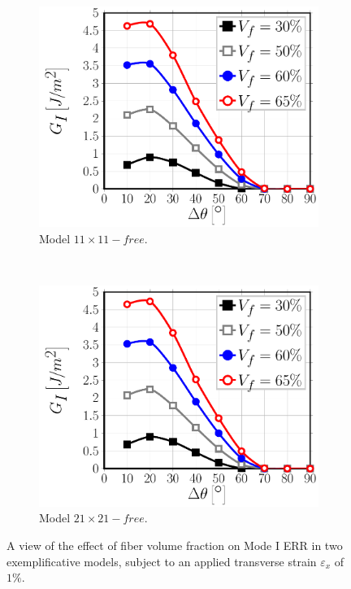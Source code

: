 \begin{figure}[!h]
\centering
    \begin{subfigure}[b]{0.45\textwidth}
        \includegraphics[width=\textwidth]{paperB/vf-smallermodel-GI.pdf}
        \caption{Model $11\times 11-free$.}\label{paperB:subfig:volfracsmallerMI}
    \end{subfigure} ~
    \begin{subfigure}[b]{0.45\textwidth}
        \includegraphics[width=\textwidth]{paperB/vf-biggermodel-GI.pdf}
        \caption{Model $21\times 21-free$.}\label{paperB:subfig:volfracbiggerMI}
    \end{subfigure}

\caption{A view of the effect of fiber volume fraction on Mode I ERR in two exemplificative models, subject to an applied transverse strain $\varepsilon_{x}$ of $1\%$.}\label{paperB:fig:volumefractionMI}
\end{figure}

